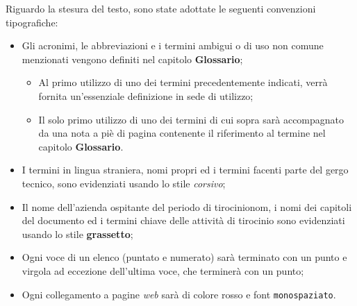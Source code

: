 Riguardo la stesura del testo, sono state adottate le seguenti convenzioni tipografiche:
\begin{itemize}
	\item Gli acronimi, le abbreviazioni e i termini ambigui o di uso non comune menzionati vengono definiti nel capitolo \textbf{Glossario}; 
        \begin{itemize}
            \item Al primo utilizzo di uno dei termini precedentemente indicati, verrà fornita un'essenziale definizione in sede di utilizzo;
            \item Il solo primo utilizzo di uno dei termini di cui sopra sarà accompagnato da una nota a piè di pagina contenente il riferimento al termine nel capitolo \textbf{Glossario}.
        \end{itemize} 
	\item I termini in lingua straniera, nomi propri ed i termini facenti parte del gergo tecnico, sono evidenziati usando lo stile \textit{corsivo};
	\item Il nome dell'azienda ospitante del periodo di tirocinionom, i nomi dei capitoli del documento ed i termini chiave delle attività di tirocinio sono evidenziati usando lo stile \textbf{grassetto};
	\item Ogni voce di un elenco (puntato e numerato) sarà terminato con un punto e virgola ad eccezione dell'ultima voce, che terminerà con un punto;
	\item Ogni collegamento a pagine \textit{web} sarà di colore rosso e font \texttt{monospaziato}.
\end{itemize}



\endgroup

\vfill
